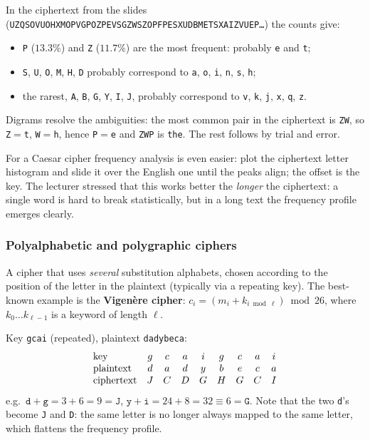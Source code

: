 \begin{example}
In the ciphertext from the slides (\texttt{UZQSOVUOHXMOPVGPOZPEVSGZWSZOPFPESXUDBMETSXAIZVUEP\dots}) the counts give:
\begin{itemize}
    \item \texttt{P} ($13.3\%$) and \texttt{Z} ($11.7\%$) are the most frequent: probably \texttt{e} and \texttt{t};
    \item \texttt{S}, \texttt{U}, \texttt{O}, \texttt{M}, \texttt{H}, \texttt{D} probably correspond to \texttt{a}, \texttt{o}, \texttt{i}, \texttt{n}, \texttt{s}, \texttt{h};
    \item the rarest, \texttt{A}, \texttt{B}, \texttt{G}, \texttt{Y}, \texttt{I}, \texttt{J}, probably correspond to \texttt{v}, \texttt{k}, \texttt{j}, \texttt{x}, \texttt{q}, \texttt{z}.
\end{itemize}
Digrams resolve the ambiguities: the most common pair in the ciphertext is \texttt{ZW}, so \texttt{Z}$=$\texttt{t}, \texttt{W}$=$\texttt{h}, hence \texttt{P}$=$\texttt{e} and \texttt{ZWP} is \texttt{the}. The rest follows by trial and error.
\end{example}

For a Caesar cipher frequency analysis is even easier: plot the ciphertext letter histogram and slide it over the English one until the peaks align; the offset is the key. The lecturer stressed that this works better the \emph{longer} the ciphertext: a single word is hard to break statistically, but in a long text the frequency profile emerges clearly.

\subsubsection{Polyalphabetic and polygraphic ciphers}

\begin{definition}
A cipher that uses \emph{several} substitution alphabets, chosen according to the position of the letter in the plaintext (typically via a repeating key). The best-known example is the \textbf{Vigenère cipher}: $c_i = (m_i + k_{i \bmod \ell}) \bmod 26$, where $k_0 \dots k_{\ell-1}$ is a keyword of length $\ell$.
\end{definition}

\begin{example}
Key \texttt{gcai} (repeated), plaintext \texttt{dadybeca}:
\[
\begin{array}{l@{\quad}cccccccc}
\text{key}        & g & c & a & i & g & c & a & i \\
\text{plaintext}  & d & a & d & y & b & e & c & a \\
\text{ciphertext} & J & C & D & G & H & G & C & I
\end{array}
\]
e.g.\ $\texttt{d}+\texttt{g} = 3+6 = 9 = \texttt{J}$, $\texttt{y}+\texttt{i} = 24+8 = 32 \equiv 6 = \texttt{G}$. Note that the two \texttt{d}'s become \texttt{J} and \texttt{D}: the same letter is no longer always mapped to the same letter, which flattens the frequency profile.
\end{example}


